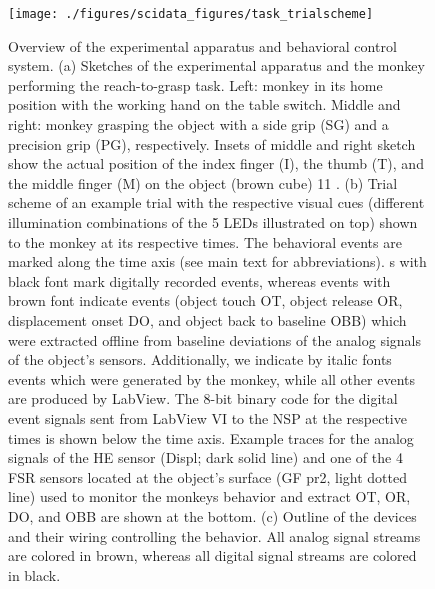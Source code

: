 \begin{figure}
 \centering
 \texttt{[image: ./figures/scidata\_figures/task\_trialscheme]}
 \caption[Overview of the experimental apparatus and behavioral control system.]{Overview of the experimental apparatus and behavioral control system. (a) Sketches of the experimental apparatus and the monkey performing the reach-to-grasp task. Left: monkey in its home position with the working hand on the table switch. Middle and right: monkey grasping the object with a side grip (SG) and a precision grip (PG), respectively. Insets of middle and right sketch show the actual position of the index finger (I), the thumb (T), and the middle finger (M) on the object (brown cube) 11 . (b) Trial scheme of an example trial with
the respective visual cues (different illumination combinations of the 5 LEDs illustrated on top) shown to the monkey at its respective times. The behavioral events are marked along the time axis (see main text for abbreviations). s with black font mark digitally recorded events, whereas events with brown font indicate events (object touch OT, object release OR, displacement onset DO, and object back to baseline OBB) which were extracted offline from baseline deviations of the analog signals of the object’s sensors. Additionally, we indicate by italic fonts events which were generated by the monkey, while all other events are produced by LabView. The 8-bit binary code for the digital event signals sent from LabView VI to the NSP at the respective times is shown below the time axis. Example traces for the analog signals of the HE sensor (Displ; dark solid line) and one of the 4 FSR sensors located at the object’s surface (GF pr2, light dotted line) used to monitor the monkeys behavior and extract
OT, OR, DO, and OBB are shown at the bottom. (c) Outline of the devices and their wiring controlling the behavior. All analog signal streams are colored in brown, whereas all digital signal streams are colored in black.}
\label{fig:task_trialscheme}
\end{figure}


